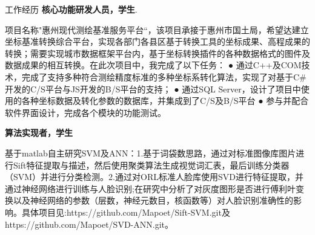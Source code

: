 \begin{rubric}{工作经历}
\entry*[2013-06 至 2014-08]\space\textbf{核心功能研发人员，学生}.

项目名称"惠州现代测绘基准服务平台“，该项目承接于惠州市国土局，希望达建立坐标基准转换综合平台，实现各部门各县区基于转换工具的坐标成果、高程成果的转换；需要实现城市数据框架平台内，基于坐标转换插件的各种数据格式的图件及数据成果的相互转换。在此次项目中，我完成了以下任务： ● 通过C++及COM技术，完成了支持多种符合测绘精度标准的多种坐标系转化算法，实现了对基于C\#开发的C/S平台与JS开发的B/S平台的支持； ● 通过SQL Server，设计了项目中使用的各种坐标数据及转化参数的数据库，并集成到了C/S及B/S平台 ● 参与并配合软件界面设计，完成各个模块的功能测试。

\entry*[2014-03 至 2014-06]\space\textbf{算法实现者，学生}

基于matlab自主研究SVM及ANN：1.基于词袋数思路，通过对标准图像库图片进行Sift特征提取与描述，然后使用聚类算法生成视觉词汇表，最后训练分类器（SVM）并进行分类检测。2.通过对ORL标准人脸库使用SVD进行特征提取，并通过神经网络进行训练与人脸识别;在研究中分析了对灰度图形是否进行傅利叶变换以及神经网络的参数（层数，神经元数目，核函数等）对人脸识别准确性的影响。具体项目见:https://github.com/Mapoet/Sift-SVM.git及https://github.com/Mapoet/SVD-ANN.git。

\end{rubric}


